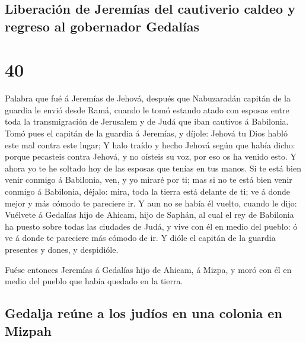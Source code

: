 \hypertarget{liberaciuxf3n-de-jeremuxedas-del-cautiverio-caldeo-y-regreso-al-gobernador-gedaluxedas}{%
\subsection{Liberación de Jeremías del cautiverio caldeo y regreso al
gobernador
Gedalías}\label{liberaciuxf3n-de-jeremuxedas-del-cautiverio-caldeo-y-regreso-al-gobernador-gedaluxedas}}

\hypertarget{section-24-40}{%
\section{40}\label{section-24-40}}

 Palabra que fué á Jeremías de Jehová, después que
Nabuzaradán capitán de la guardia le envió desde Ramá, cuando le tomó
estando atado con esposas entre toda la transmigración de Jerusalem y de
Judá que iban cautivos á Babilonia.  Tomó pues el capitán
de la guardia á Jeremías, y díjole: Jehová tu Dios habló este mal contra
este lugar;  Y halo traído y hecho Jehová según que había
dicho: porque pecasteis contra Jehová, y no oísteis su voz, por eso os
ha venido esto.  Y ahora yo te he soltado hoy de las
esposas que tenías en tus manos. Si te está bien venir conmigo á
Babilonia, ven, y yo miraré por ti; mas si no te está bien venir conmigo
á Babilonia, déjalo: mira, toda la tierra está delante de ti; ve á donde
mejor y más cómodo te pareciere ir.  Y aun no se había él
vuelto, cuando le dijo: Vuélvete á Gedalías hijo de Ahicam, hijo de
Saphán, al cual el rey de Babilonia ha puesto sobre todas las ciudades
de Judá, y vive con él en medio del pueblo: ó ve á donde te pareciere
más cómodo de ir. Y dióle el capitán de la guardia presentes y dones, y
despidióle.

 Fuése entonces Jeremías á Gedalías hijo de Ahicam, á
Mizpa, y moró con él en medio del pueblo que había quedado en la tierra.

\hypertarget{gedalja-reuxfane-a-los-juduxedos-en-una-colonia-en-mizpah}{%
\subsection{Gedalja reúne a los judíos en una colonia en
Mizpah}\label{gedalja-reuxfane-a-los-juduxedos-en-una-colonia-en-mizpah}}

